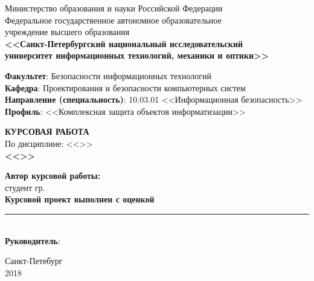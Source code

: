 \thispagestyle{empty}


\begin{center}
	Министерство образования и науки Российской Федерации
\\
	Федеральное государственное автономное образовательное\\
	учреждение высшего образования
\\
	\textbf{<<Санкт-Петербургский национальный исследовательский
\\
	университет информационных технологий, механики и оптики>>}
\end{center}

\begin{center}
\textbf{Факультет}: Безопасности информационных технологий
\\
\textbf{Кафедра}: Проектирования и безопасности компьютерных систем
\\
\textbf{Направление (специальность)}: 10.03.01 <<Информационная безопасность>>
\\
\textbf{Профиль}: <<Комплексная защита объектов информатизации>>

\vfill

{\large \textbf{КУРСОВАЯ РАБОТА}} \\
По дисциплине: <<\Subject>> \\

\textbf{<<\Theme>>}

\vfill

\end{center}

\vfill

\begin{flushleft}
\textbf{Автор курсовой работы:}	\\
студент гр. \Group \  \FullName \\
\textbf{Курсовой проект выполнен с оценкой} \rule{6em}{.1pt}\\
\textbf{Руководитель}: \Teacher

\end{flushleft}

\vfill

\begin{center}
	Санкт-Петебург \\
	2018
\end{center}


